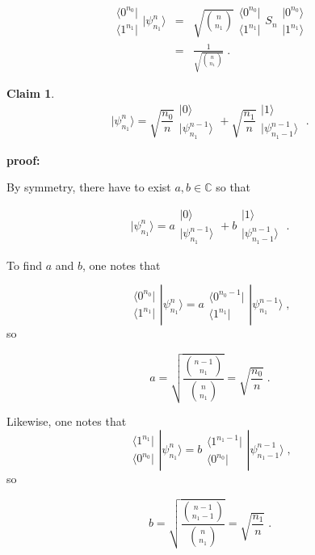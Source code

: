 \documentclass[12pt]{article}%
\newtheorem{claim}{Claim}
\newcommand{\proof}[0]{{\bf proof:} }
\newcommand{\qed}[0]{\newline\noindent{\bf QED }}
\newcommand{\bra}[1]{\langle#1|}
\newcommand{\ket}[1]{|#1\rangle}
\newcommand{\beq}{\begin{equation}}
\newcommand{\eeq}{\end{equation}}
\newcommand{\beqa}{\begin{eqnarray}}
\newcommand{\eeqa}{\end{eqnarray}}
\newcommand{\CC}[0]{{ \mathbb{C}} }
\newcommand{\brazo}{ \begin{array}{r}
 \bra{0^{n_0}}
 \\
 \bra{1^{n_1}}
 \end{array}
 }
\newcommand{\ketzo}{ \begin{array}{l}
 \ket{0^{n_0}}
 \\
 \ket{1^{n_1}}
 \end{array}
 }
\begin{document}
{ \beqa
 \brazo \ket{\psi^n_{n_1}} &=&
 \sqrt{n\choose n_1}
 \brazo S_n \ketzo
 \\
 &=&
  \frac{1}{\sqrt{n\choose n_1}}
 \;.
 \eeqa
 \qed

 \begin{claim}

 \beq
 \ket{\psi^n_{n_1}}=
 \sqrt{\frac{n_0}{n}}
 \begin{array}{l}
 \ket{0}
 \\
 \ket{\psi^{n-1}_{n_1}}
 \end{array}
 +
 \sqrt{\frac{n_1}{n}}
 \begin{array}{l}
 \ket{1}
 \\
 \ket{\psi^{n-1}_{n_1-1}}
 \end{array}
 \;.
 \label{eq-top-qubit-resolved}
 \eeq
 \end{claim}
 \proof

 By symmetry, there
 have to exist $a,b \in \CC$
 so that

 \beq
 \ket{\psi^n_{n_1}}=
 a
 \begin{array}{l}
 \ket{0}
 \\
 \ket{\psi^{n-1}_{n_1}}
 \end{array}
 +
 b
 \begin{array}{l}
 \ket{1}
 \\
 \ket{\psi^{n-1}_{n_1-1}}
 \end{array}
 \;.
 \eeq

 To find $a$ and $b$, one notes that

 \beq
 \brazo \ket{\psi^n_{n_1}}
 =
 a
 \begin{array}{r}
  \bra{0^{n_0-1}}
 \\
 \bra{1^{n_1}}
 \end{array}
  \ket{\psi^{n-1}_{n_1}}
 \;,
 \eeq
 so

 \beq
 a = \sqrt{\frac{{n-1\choose n_1}}{{n\choose n_1}}}
=
 \sqrt{\frac{n_0}{n}}
 \;.
 \eeq

Likewise, one notes that
 \beq
  \begin{array}{r}
  \bra{1^{n_1}}
 \\
 \bra{0^{n_0}}
 \end{array}
 \ket{\psi^n_{n_1}}
 =
 b
 \begin{array}{r}
  \bra{1^{n_1-1}}
 \\
 \bra{0^{n_0}}
 \end{array}
  \ket{\psi^{n-1}_{n_1-1}}
 \;,
 \eeq
 so

 \beq
 b = \sqrt{\frac{{n-1\choose n_1-1}}{{n\choose n_1}}}
=
 \sqrt{\frac{n_1}{n}}
 \;.
 \eeq
 \qed

}
\end{document}
